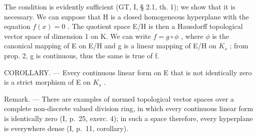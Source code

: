 The condition is evidently sufficient (GT, I, § 2.1, th. 1); we show that it is necessary. We can suppose that H is a closed homogeneous hyperplane with the equation \(f(x) = 0\) . The quotient space E/H is then a Hausdorff topological vector space of dimension 1 on K. We can write \(f = g \circ \phi\) , where \(\phi\) is the canonical mapping of E on E/H and g is a linear mapping of E/H on \(K_{s}\) ; from prop. 2, g is continuous, thus the same is true of f.

COROLLARY. --- Every continuous linear form on E that is not identically zero is a strict morphism of E on \(K_{s}\) .

Remark. --- There are examples of normed topological vector spaces over a complete non-discrete valued division ring, in which every continuous linear form is identically zero (I, p.~25, exerc. 4); in such a space therefore, every hyperplane is everywhere dense (I, p.~11, corollary).

